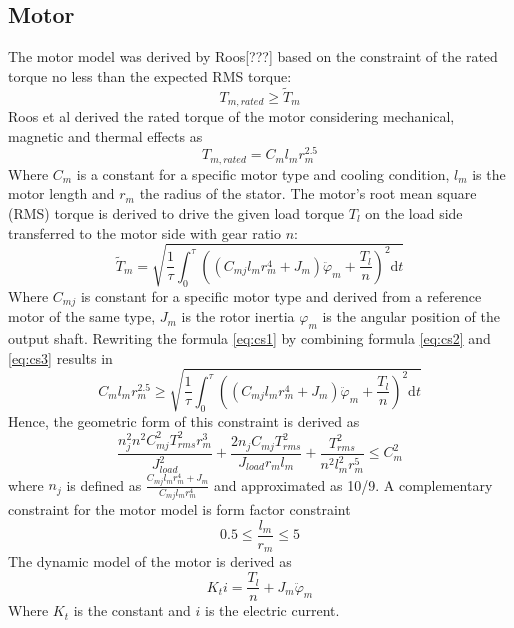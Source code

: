\subsection*{Motor}
The motor model was derived by Roos[???] based on the constraint of the rated torque no less than the expected RMS torque:
\begin{equation} \label{eq:cs1}
T_{m,rated} \geqslant \tilde{T}_m
\end{equation}
Roos et al derived the rated torque of the motor considering mechanical, magnetic and thermal effects as
\begin{equation} \label{eq:cs2}
T_{m,rated}=C_ml_m r_m^{2.5}
\end{equation}
Where $C_m$ is a constant for a specific motor type and cooling condition, $l_m$ is the motor length and $r_m$ the radius of the stator. The motor$’$s root mean square (RMS) torque is derived to drive the given load torque $T_l$ on the load side transferred to the motor side with gear ratio $n$:
\begin{equation} \label{eq:cs3}
\tilde{T}_m=\sqrt{\frac{1}{\tau}\int_0^\tau ((C_{mj}l_m r_m^{4}+J_m)\ddot{\varphi}_m+\frac{T_l}{n})^2  \mathrm{d} t}
\end{equation}
Where $C_{mj}$ is constant for a specific motor type and derived from a reference motor of the same type, $J_m$ is the rotor inertia ${\varphi}_m$ is the angular position of the output shaft.
Rewriting the formula \ref{eq:cs1} by combining formula \ref{eq:cs2} and \ref{eq:cs3} results in
\begin{equation} \label{eq:cs4}
C_ml_m r_m^{2.5}\geqslant\sqrt{\frac{1}{\tau}\int_0^\tau ((C_{mj}l_m r_m^{4}+J_m)\ddot{\varphi}_m+\frac{T_l}{n})^2  \mathrm{d} t}
\end{equation}
Hence, the geometric form of this constraint is derived as
\begin{equation} \label{eq:cs5}
\frac{n_j^2 n^2 C_{mj}^2 T_{rms}^2 r_m^3}{J_{load}^2} + \frac{2 n_j C_{mj} T_{rms}^2}{J_{load} r_m l_m} + \frac{T_{rms}^2}{n^2 l_m^2 r_m^5} \leqslant C_m^2
\end{equation}
where $n_j$ is defined as $\frac{C_{mj}l_m r_m^{4}+J_m}{C_{mj}l_m r_m^{4}}$ and approximated as 10/9. 
A complementary constraint for the motor model is form factor constraint
\begin{equation} \label{eq:cs6}
0.5 \leqslant \frac{l_m}{r_m} \leqslant 5
\end{equation}
The dynamic model of the motor is derived as
\begin{equation} \label{eq:cs7}
K_ti= \frac{T_l}{n} + J_m\ddot{{\varphi}}_m
\end{equation}
Where $K_t$ is the constant and $i$ is the electric current.


